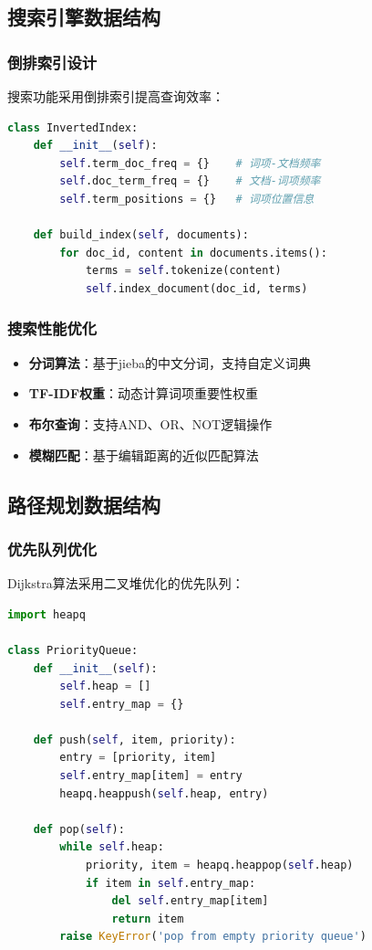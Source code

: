 \documentclass[12pt,a4paper]{article}
\begin{document}
\subsection{搜索引擎数据结构}

\subsubsection{倒排索引设计}
搜索功能采用倒排索引提高查询效率：

\begin{lstlisting}[language=python, caption={倒排索引数据结构}]
class InvertedIndex:
    def __init__(self):
        self.term_doc_freq = {}    # 词项-文档频率
        self.doc_term_freq = {}    # 文档-词项频率
        self.term_positions = {}   # 词项位置信息
        
    def build_index(self, documents):
        for doc_id, content in documents.items():
            terms = self.tokenize(content)
            self.index_document(doc_id, terms)
\end{lstlisting}

\subsubsection{搜索性能优化}
\begin{itemize}
    \item \textbf{分词算法}：基于jieba的中文分词，支持自定义词典
    \item \textbf{TF-IDF权重}：动态计算词项重要性权重
    \item \textbf{布尔查询}：支持AND、OR、NOT逻辑操作
    \item \textbf{模糊匹配}：基于编辑距离的近似匹配算法
\end{itemize}

\subsection{路径规划数据结构}

\subsubsection{优先队列优化}
Dijkstra算法采用二叉堆优化的优先队列：

\begin{lstlisting}[language=python, caption={路径规划优先队列}]
import heapq

class PriorityQueue:
    def __init__(self):
        self.heap = []
        self.entry_map = {}
        
    def push(self, item, priority):
        entry = [priority, item]
        self.entry_map[item] = entry
        heapq.heappush(self.heap, entry)
        
    def pop(self):
        while self.heap:
            priority, item = heapq.heappop(self.heap)
            if item in self.entry_map:
                del self.entry_map[item]
                return item
        raise KeyError('pop from empty priority queue')
\end{lstlisting}
\end{document}
